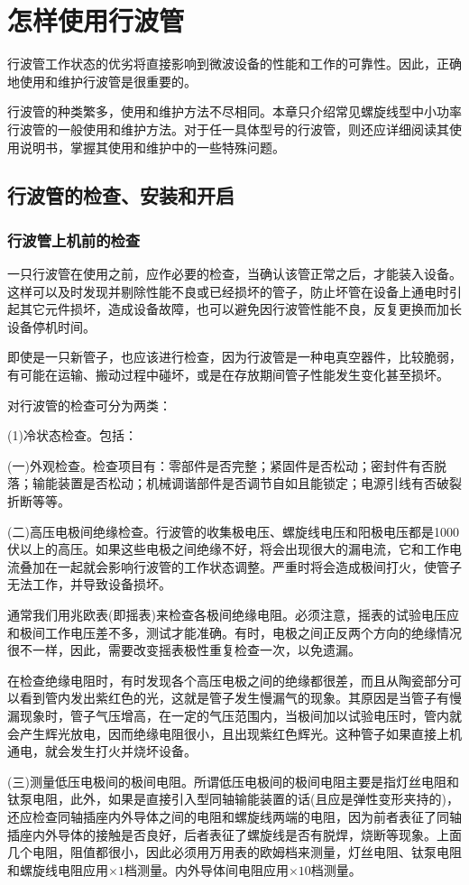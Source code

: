 \chapter{怎样使用行波管}
行波管工作状态的优劣将直接影响到微波设备的性能和工作的可靠性。因此，正确地使用和维护行波管是很重要的。

行波管的种类繁多，使用和维护方法不尽相同。本章只介绍常见螺旋线型中小功率行波管的一般使用和维护方法。对于任一具体型号的行波管，则还应详细阅读其使用说明书，掌握其使用和维护中的一些特殊问题。
\section{行波管的检查、安装和开启}
\subsection{行波管上机前的检查}
一只行波管在使用之前，应作必要的检查，当确认该管正常之后，才能装入设备。这样可以及时发现并剔除性能不良或已经损坏的管子，防止坏管在设备上通电时引起其它元件损坏，造成设备故障，也可以避免因行波管性能不良，反复更换而加长设备停机时间。

即使是一只新管子，也应该进行检查，因为行波管是一种电真空器件，比较脆弱，有可能在运输、搬动过程中碰坏，或是在存放期间管子性能发生变化甚至损坏。

对行波管的检查可分为两类：

(1)冷状态检查。包括：

(一)外观检查。检查项目有：零部件是否完整；紧固件是否松动；密封件有否脱落；输能装置是否松动；机械调谐部件是否调节自如且能锁定；电源引线有否破裂折断等等。

(二)高压电极间绝缘检查。行波管的收集极电压、螺旋线电压和阳极电压都是1000伏以上的高压。如果这些电极之间绝缘不好，将会出现很大的漏电流，它和工作电流叠加在一起就会影响行波管的工作状态调整。严重时将会造成极间打火，使管子无法工作，并导致设备损坏。

通常我们用兆欧表(即摇表)来检查各极间绝缘电阻。必须注意，摇表的试验电压应和极间工作电压差不多，测试才能准确。有时，电极之间正反两个方向的绝缘情况很不一样，因此，需要改变摇表极性重复检查一次，以免遗漏。

在检查绝缘电阻时，有时发现各个高压电极之间的绝缘都很差，而且从陶瓷部分可以看到管内发出紫红色的光，这就是管子发生慢漏气的现象。其原因是当管子有慢漏现象时，管子气压增高，在一定的气压范围内，当极间加以试验电压时，管内就会产生辉光放电，因而绝缘电阻很小，且出现紫红色辉光。这种管子如果直接上机通电，就会发生打火并烧坏设备。

(三)测量低压电极间的极间电阻。所谓低压电极间的极间电阻主要是指灯丝电阻和钛泵电阻，此外，如果是直接引入型同轴输能装置的话(且应是弹性变形夹持的)，还应检查同轴插座内外导体之间的电阻和螺旋线两端的电阻，因为前者表征了同轴插座内外导体的接触是否良好，后者表征了螺旋线是否有脱焊，烧断等现象。上面几个电阻，阻值都很小，因此必须用万用表的欧姆档来测量，灯丝电阻、钛泵电阻和螺旋线电阻应用$ \times 1 $档测量。内外导体间电阻应用$\times 10 $档测量。


